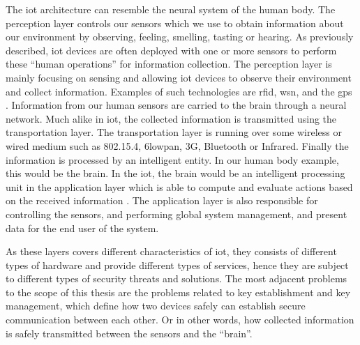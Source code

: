 The \gls{iot} architecture can resemble the neural system of the human body. The perception layer controls our sensors which we use to obtain information about our environment by observing, feeling, smelling, tasting or hearing. As previously described, \gls{iot} devices are often deployed with one or more sensors to perform these ``human operations'' for information collection. The perception layer is mainly focusing on sensing and allowing \gls{iot} devices to observe their environment and collect information. Examples of such technologies are \gls{rfid}, \gls{wsn}, and the \gls{gps} \citep{Jing2014}. Information from our human sensors are carried to the brain through a neural network. Much alike in \gls{iot}, the collected information is transmitted using the transportation layer. The transportation layer is running over some wireless or wired medium such as 802.15.4, \gls{6lowpan}, 3G, Bluetooth or Infrared. Finally the information is processed by an intelligent entity. In our human body example, this would be the brain. In the \gls{iot}, the brain would be an intelligent processing unit in the application layer which is able to compute and evaluate actions based on the received information \cite{iot-layers2012} \cite{iot-layers2010}. The application layer is also responsible for controlling the sensors, and performing global system management, and present data for the end user of the system.


As these layers covers different characteristics of \gls{iot}, they consists of different types of hardware and provide different types of services, hence they are subject to different types of security threats and solutions. The most adjacent problems to the scope of this thesis are the problems related to key establishment and key management, which define how two devices safely can establish secure communication between each other. Or in other words, how collected information is safely transmitted between the sensors and the ``brain''. 




